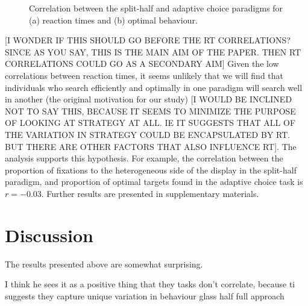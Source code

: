 \documentclass[]{rsos}%
\begin{document}
\begin{figure}
\centering
{}
\caption{Correlation between the split-half and adaptive choice paradigms for (a) reaction times and (b) optimal behaviour.}
\label{fig:between_para_rt}
\end{figure}

[I WONDER IF THIS SHOULD GO BEFORE THE RT CORRELATIONS? SINCE AS YOU SAY, THIS IS THE MAIN AIM OF THE PAPER. THEN RT CORRELATIONS COULD GO AS A SECONDARY AIM] Given the low correlations between reaction times, it seems unlikely that we will find that individuals who search efficiently and optimally in one paradigm will search well in another (the original motivation for our study) [I WOULD BE INCLINED NOT TO SAY THIS, BECAUSE IT SEEMS TO MINIMIZE THE PURPOSE OF LOOKING AT STRATEGY AT ALL. IE IT SUGGESTS THAT ALL OF THE VARIATION IN STRATEGY COULD BE ENCAPSULATED BY RT. BUT THERE ARE OTHER FACTORS THAT ALSO INFLUENCE RT]. The analysis supports this hypothesis. For example, the correlation between the proportion of fixations to the heterogeneous side of the display in the split-half paradigm, and proportion of optimal targets found in the adaptive choice task is $r=-0.03$. Further results are presented in supplementary materials. 

\section{Discussion}

The results presented above are somewhat surprising. 


I think he sees it as a positive thing that they tasks don't correlate, because ti suggests they capture unique variation in behaviour
glass half full approach 



\end{document}
